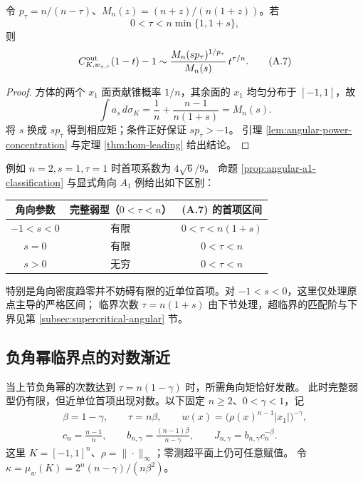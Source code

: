 \begin{proposition}[角向幂权的精确首项]\label{prop:signed-angular-leading}
令 $p_\tau=n/(n-\tau)$、$M_n(z)=(n+z)/(n(1+z))$。若
\[
0<\tau<n\min\{1,1+s\},
\]
则
\[
C^{\rm out}_{K,w_{s,\tau}}(1-t)-1\sim
\frac{M_n(sp_\tau)^{1/p_\tau}}{M_n(s)}\,t^{\tau/n}.
\tag{A.7}
\]
\end{proposition}
\begin{proof}
方体的两个 $x_1$ 面贡献锥概率 $1/n$，其余面的 $x_1$ 均匀分布于 $[-1,1]$，故
\[
\int a_s\,d\sigma_K=\frac1n+\frac{n-1}{n(1+s)}=M_n(s).
\]
将 $s$ 换成 $sp_\tau$ 得到相应矩；条件正好保证 $sp_\tau>-1$。
引理 \ref{lem:angular-power-concentration} 与定理 \ref{thm:hom-leading} 给出结论。
\end{proof}

例如 $n=2,s=1,\tau=1$ 时首项系数为 $4\sqrt6/9$。
命题 \ref{prop:angular-a1-classification} 与显式角向 $A_1$ 例给出如下区别：
\begin{center}
\begin{tabular}{c|c|c}
角向参数 & 完整弱型（$0<\tau<n$） & (A.7) 的首项区间\\\hline
$-1<s<0$ & 有限 & $0<\tau<n(1+s)$\\
$s=0$ & 有限 & $0<\tau<n$\\
$s>0$ & 无穷 & $0<\tau<n$
\end{tabular}
\end{center}
特别是角向密度趋零并不妨碍有限的近单位首项。对 $-1<s<0$，这里仅处理原点主导的严格区间；
临界次数 $\tau=n(1+s)$ 由下节处理，超临界的匹配阶与下界见第 \ref{subsec:supercritical-angular} 节。

\subsection{负角幂临界点的对数渐近}\label{subsec:critical-angular}
当上节负角幂的次数达到 $\tau=n(1-\gamma)$ 时，所需角向矩恰好发散。
此时完整弱型仍有限，但近单位首项出现对数。以下固定 $n\ge2$、$0<\gamma<1$，记
\[
\begin{gathered}
 \beta=1-\gamma,\qquad \tau=n\beta,\qquad
 w(x)=\bigl(\rho(x)^{n-1}|x_1|\bigr)^{-\gamma},\\
 c_n=\frac{n-1}{n},\qquad b_{n,\gamma}=\frac{(n-1)\beta}{n-\gamma},
 \qquad J_{n,\gamma}=b_{n,\gamma}c_n^{-\beta}.
\end{gathered}\tag{AC.1}
\]
这里 $K=[-1,1]^n$、$\rho=\|\cdot\|_\infty$；零测超平面上仍可任意赋值。
令 $\kappa=\mu_w(K)=2^n(n-\gamma)/(n\beta^2)$。

